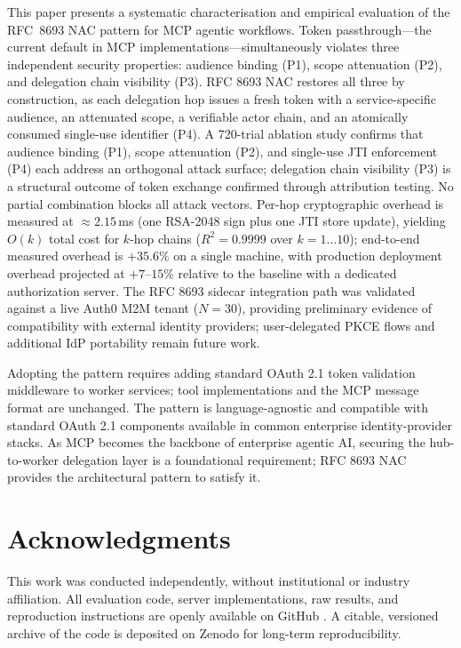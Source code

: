 \documentclass[journal]{IEEEtran}
\theoremstyle{definition}
\begin{document}
This paper presents a systematic characterisation and empirical evaluation of the
RFC~8693 NAC pattern for MCP agentic workflows. Token
passthrough---the current default in MCP implementations---simultaneously
violates three independent security properties: audience binding (P1), scope
attenuation (P2), and delegation chain visibility (P3). RFC 8693 NAC restores
all three by construction, as each delegation hop issues a fresh token with a
service-specific audience, an attenuated scope, a verifiable actor chain, and
an atomically consumed single-use identifier (P4). A 720-trial ablation study
confirms that audience binding (P1), scope attenuation (P2), and single-use
JTI enforcement (P4) each address an orthogonal attack surface; delegation chain
visibility (P3) is a structural outcome of token exchange confirmed through
attribution testing. No partial combination blocks all attack vectors. Per-hop
cryptographic overhead is measured at $\approx 2.15$\,ms (one RSA-2048 sign
plus one JTI store update), yielding $O(k)$ total cost for $k$-hop
chains ($R^2 = 0.9999$ over $k=1\ldots10$); end-to-end measured overhead is
$+35.6\%$ on a single machine, with production deployment overhead projected at
$+7$--$15\%$ relative to the baseline with a dedicated authorization server.
The RFC 8693 sidecar integration path was validated against a live Auth0 M2M
tenant ($N=30$), providing preliminary evidence of compatibility with external
identity providers; user-delegated PKCE flows and additional IdP portability
remain future work.

Adopting the pattern requires adding standard OAuth 2.1 token validation
middleware to worker services; tool implementations and the MCP message format
are unchanged. The pattern is language-agnostic and compatible with standard OAuth 2.1
components available in common enterprise identity-provider stacks.
As MCP becomes the backbone of enterprise agentic AI, securing the
hub-to-worker delegation layer is a foundational requirement; RFC 8693 NAC
provides the architectural pattern to satisfy it.

\FloatBarrier  %

\section*{Acknowledgments}
This work was conducted independently, without institutional or industry
affiliation. All evaluation code, server implementations, raw results, and
reproduction instructions are openly available on GitHub \cite{nac_mcp_impl}.
A citable, versioned archive of the code is deposited on Zenodo
\cite{nac_mcp_impl} for long-term reproducibility.
\end{document}
